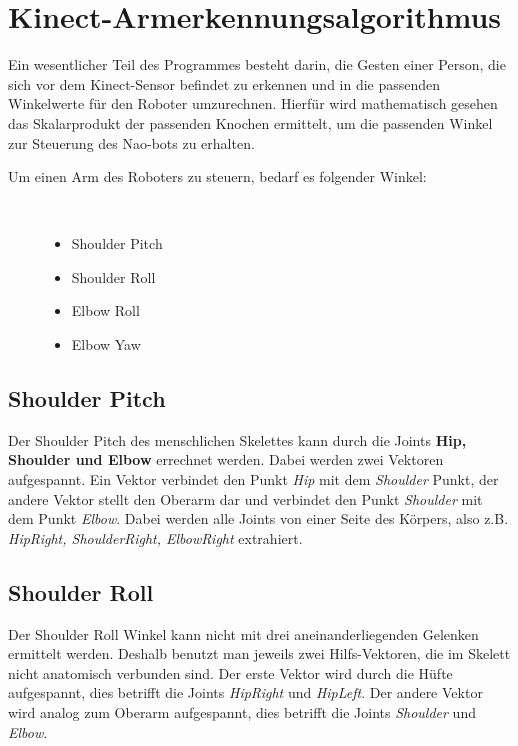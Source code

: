 \section{Kinect-Armerkennungsalgorithmus}\label{algo_angle}
Ein wesentlicher Teil des Programmes besteht darin, die Gesten einer Person, die sich vor dem Kinect-Sensor befindet zu erkennen und in die passenden Winkelwerte für den Roboter umzurechnen.
Hierfür wird mathematisch gesehen das Skalarprodukt der passenden Knochen ermittelt, um die passenden Winkel zur Steuerung des Nao-bots zu erhalten.

\begin{description}
	\item[Um einen Arm des Roboters zu steuern, bedarf es folgender Winkel:]~\par
	\begin{itemize}
		\item Shoulder Pitch
		\item Shoulder Roll
		\item Elbow Roll
		\item Elbow Yaw
	\end{itemize}
\end{description}

\subsection{Shoulder Pitch}
Der Shoulder Pitch des menschlichen Skelettes kann durch die Joints \textbf{Hip, Shoulder und Elbow} errechnet werden. Dabei werden zwei Vektoren aufgespannt. Ein Vektor verbindet den Punkt \textit{Hip} mit dem \textit{Shoulder} Punkt, der andere Vektor stellt den Oberarm dar und verbindet den Punkt \textit{Shoulder} mit dem Punkt \textit{Elbow}. Dabei werden alle Joints von einer Seite des Körpers, also z.B. \textit{HipRight, ShoulderRight, ElbowRight} extrahiert.


\subsection{Shoulder Roll}
Der Shoulder Roll Winkel kann nicht mit drei aneinanderliegenden Gelenken ermittelt werden. Deshalb benutzt man jeweils zwei Hilfs-Vektoren, die im Skelett nicht anatomisch verbunden sind. Der erste Vektor wird durch die Hüfte aufgespannt, dies betrifft die Joints \textit{HipRight} und \textit{HipLeft}. Der andere Vektor wird analog zum Oberarm aufgespannt, dies betrifft die Joints \textit{Shoulder} und \textit{Elbow}.


